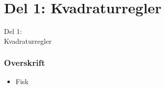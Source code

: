 \section{Del 1: Kvadraturregler}
\begin{frame}
\centering
\Huge
Del 1: \\
Kvadraturregler
\end{frame}
%
\begin{frame}
\frametitle{Overskrift}
\begin{itemize}
\item Fisk
\end{itemize}
\end{frame}

